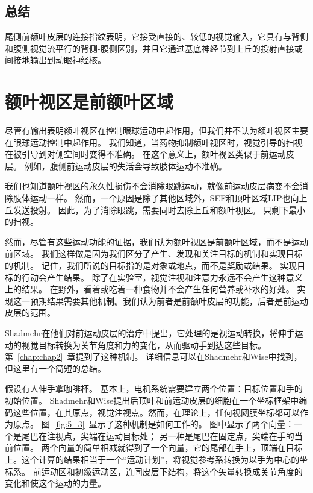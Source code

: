 \subsection{总结}

尾侧前额叶皮层的连接指纹表明，它接受直接的、较低的视觉输入，它具有与背侧和腹侧视觉流平行的背侧-腹侧区别，并且它通过基底神经节到上丘的投射直接或间接地输出到动眼神经核。



\section{额叶视区是前额叶区域}

尽管有输出表明额叶视区在控制眼球运动中起作用，但我们并不认为额叶视区主要在眼球运动控制中起作用。
我们知道，当药物抑制额叶视区时，视觉引导的扫视在被引导到对侧空间时变得不准确\cite{sommer1997reversible}。
在这个意义上，额叶视区类似于前运动皮层。
例如，腹侧前运动皮层的失活会导致肢体运动不准确\cite{kurata1994differential}。


我们也知道额叶视区的永久性损伤不会消除眼跳运动，就像前运动皮层病变不会消除肢体运动一样。
然而，一个原因是除了其他区域外，SEF\cite{huerta1990supplementary}和顶叶区域LIP\cite{holloway2002brief}也向上丘发送投射。
因此，为了消除眼跳，需要同时去除上丘和额叶视区\cite{schiller1979effects,schiller1987effect}。
只剩下最小的扫视。


然而，尽管有这些运动功能的证据，我们认为额叶视区是前额叶区域，而不是运动前区域。
我们这样做是因为我们区分了产生、发现和关注目标的机制和实现目标的机制。
记住，我们所说的目标指的是对象或地点，而不是奖励或结果。
实现目标的行动会产生结果。
除了在实验室，视觉注视和注意力永远不会产生这种意义上的结果。
在野外，看着或吃着一种食物并不会产生任何营养或补水的好处。
实现这一预期结果需要其他机制。我们认为前者是前额叶皮层的功能，后者是前运动皮层的范围。


Shadmehr\cite{shadmehr2004computational}在他们对前运动皮层的治疗中提出，它处理的是视运动转换，将伸手运动的视觉目标转换为关节角度和力的变化，从而驱动手到达这些目标。
第~\ref{chap:chap2}~章提到了这种机制。
详细信息可以在Shadmehr和Wise中找到，但这里有一个简短的总结。


假设有人伸手拿咖啡杯。
基本上，电机系统需要建立两个位置：目标位置和手的初始位置。
Shadmehr和Wise提出后顶叶和前运动皮层的细胞在一个坐标框架中编码这些位置，在其原点，视觉注视点。然而，在理论上，任何视网膜坐标都可以作为原点。
图~\ref{fig:5_3}~显示了这种机制是如何工作的。
图中显示了两个向量：一个是尾巴在注视点，尖端在运动目标处；
另一种是尾巴在固定点，尖端在手的当前位置。
两个向量的简单相减就得到了一个向量，它的尾部在手上，顶端在目标上。这个计算的结果相当于一个“运动计划”，将视觉参考系转换为以手为中心的坐标系。
前运动区和初级运动区，连同皮层下结构，将这个矢量转换成关节角度的变化和使这个运动的力量。


